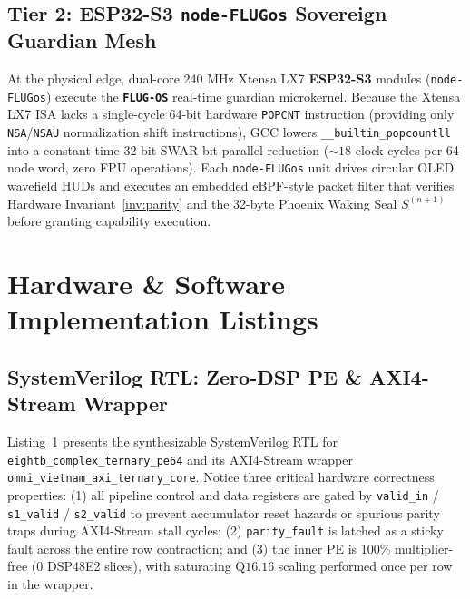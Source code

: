 \documentclass[10pt, twocolumn, a4paper]{article}
\begin{document}
\subsection{Tier 2: ESP32-S3 \texorpdfstring{\texttt{node-FLUGos}}{node-FLUGos} Sovereign Guardian Mesh}
At the physical edge, dual-core 240 MHz Xtensa LX7 \textbf{ESP32-S3} modules (\texttt{node-FLUGos}) execute the \textbf{\texttt{FLUG-OS}} real-time guardian microkernel. Because the Xtensa LX7 ISA lacks a single-cycle 64-bit hardware \texttt{POPCNT} instruction (providing only \texttt{NSA}/\texttt{NSAU} normalization shift instructions), GCC lowers \texttt{\_\_builtin\_popcountll} into a constant-time 32-bit SWAR bit-parallel reduction ($\sim 18$ clock cycles per 64-node word, zero FPU operations). Each \texttt{node-FLUGos} unit drives circular OLED wavefield HUDs and executes an embedded eBPF-style packet filter \cite{mccanne1993bsd} that verifies Hardware Invariant~\ref{inv:parity} and the 32-byte Phoenix Waking Seal $S^{(n+1)}$ before granting capability execution.

\section{Hardware \& Software Implementation Listings}

\subsection{SystemVerilog RTL: Zero-DSP PE \& AXI4-Stream Wrapper}
Listing~1 presents the synthesizable SystemVerilog RTL for \texttt{eightb\_complex\_ternary\_pe64} and its AXI4-Stream wrapper \texttt{omni\_vietnam\_axi\_ternary\_core}. Notice three critical hardware correctness properties: (1) all pipeline control and data registers are gated by \texttt{valid\_in} / \texttt{s1\_valid} / \texttt{s2\_valid} to prevent accumulator reset hazards or spurious parity traps during AXI4-Stream stall cycles; (2) \texttt{parity\_fault} is latched as a sticky fault across the entire row contraction; and (3) the inner PE is 100\% multiplier-free (0 DSP48E2 slices), with saturating $\text{Q16.16}$ scaling performed once per row in the wrapper.
\end{document}
